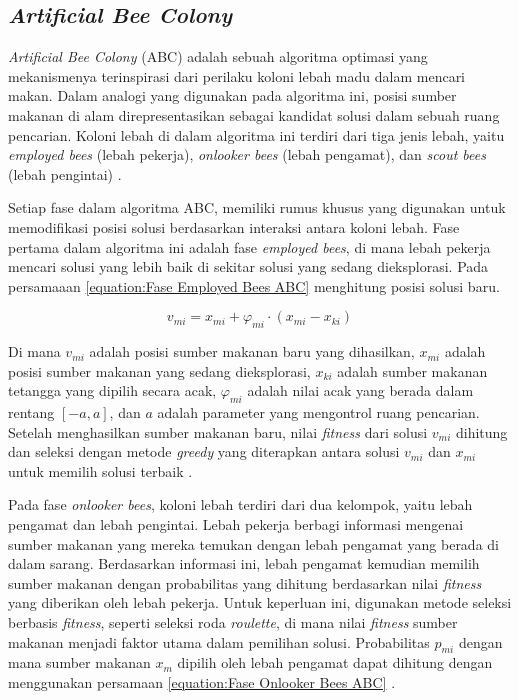 \subsection{\textit{Artificial Bee Colony}}
\textit{Artificial Bee Colony} (ABC) adalah sebuah algoritma optimasi yang mekanismenya terinspirasi dari perilaku koloni lebah madu dalam mencari makan. Dalam analogi yang digunakan pada algoritma ini, posisi sumber makanan di alam direpresentasikan sebagai kandidat solusi dalam sebuah ruang pencarian. Koloni lebah di dalam algoritma ini terdiri dari tiga jenis lebah, yaitu \textit{employed bees} (lebah pekerja), \textit{onlooker bees} (lebah pengamat), dan \textit{scout bees} (lebah pengintai) \parencite{Wang2021}.

Setiap fase dalam algoritma ABC, memiliki rumus khusus yang digunakan untuk memodifikasi posisi solusi berdasarkan interaksi antara koloni lebah. Fase pertama dalam algoritma ini adalah fase \textit{employed bees}, di mana lebah pekerja mencari solusi yang lebih baik di sekitar solusi yang sedang dieksplorasi. Pada persamaaan \ref{equation:Fase Employed Bees ABC} menghitung posisi solusi baru.

\begin{equation}
\label{equation:Fase Employed Bees ABC}
    v_{mi} = x_{mi} + \varphi_{mi} \cdot (x_{mi} - x_{ki})
\end{equation}

Di mana \(v_{mi}\) adalah posisi sumber makanan baru yang dihasilkan, \(x_{mi}\) adalah posisi sumber makanan yang sedang dieksplorasi, \(x_{ki}\) adalah sumber makanan tetangga yang dipilih secara acak, \(\varphi_{mi}\) adalah nilai acak yang berada dalam rentang \([-a, a]\), dan \(a\) adalah parameter yang mengontrol ruang pencarian. Setelah menghasilkan sumber makanan baru, nilai \textit{fitness} dari solusi \(v_{mi}\) dihitung dan seleksi dengan metode \textit{greedy} yang diterapkan antara solusi \(v_{mi}\) dan \(x_{mi}\) untuk memilih solusi terbaik \parencite{Karaboga2010}.

Pada fase \textit{onlooker bees}, koloni lebah terdiri dari dua kelompok, yaitu lebah pengamat dan lebah pengintai. Lebah pekerja berbagi informasi mengenai sumber makanan yang mereka temukan dengan lebah pengamat yang berada di dalam sarang. Berdasarkan informasi ini, lebah pengamat kemudian memilih sumber makanan dengan probabilitas yang dihitung berdasarkan nilai \textit{fitness} yang diberikan oleh lebah pekerja. Untuk keperluan ini, digunakan metode seleksi berbasis \textit{fitness}, seperti seleksi roda \textit{roulette}, di mana nilai \textit{fitness} sumber makanan menjadi faktor utama dalam pemilihan solusi. Probabilitas \(p_{mi}\) dengan mana sumber makanan \(x_m\) dipilih oleh lebah pengamat dapat dihitung dengan menggunakan persamaan \ref{equation:Fase Onlooker Bees ABC} \parencite{Karaboga2010}.

